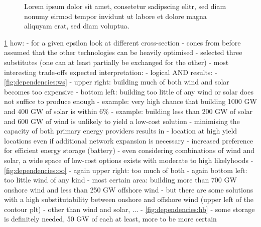 
\begin{figure}
    \noindent{}
    \caption{Lorem ipsum dolor sit amet, consetetur sadipscing elitr, sed diam nonumy eirmod tempor invidunt ut labore et dolore magna aliquyam erat, sed diam voluptua.}
    \label{fig:dependencies}
\end{figure}

\cref{fig:dependencies}
how:
- for a given epsilon look at different cross-section
- cones from before assumed that the other technologies can be heavily optimised
- selected three substitutes (one can at least partially be exchanged for the other) - most interesting trade-offs expected
interpretation:
- logical AND
results:
- \cref{fig:dependencies:ws}
  - upper right: building much of both wind and solar becomes too expensive
  - bottom left: building too little of any wind or solar does not suffice to produce enough
  - example: very high chance that building 1000 GW and 400 GW of solar is within 6\%
  - example: building less than 200 GW of solar and 600 GW of wind is unlikely to yield a low-cost solution
  - minimising the capacity of both primary energy providers results in
    - location at high yield locations even if additional network expansion is necessary
    - increased preference for efficient energy storage (battery)
  - even considering combinations of wind and solar, a wide space of low-cost options exists with moderate to high likelyhoods 
- \cref{fig:dependencies:oo}
  - again upper right: too much of both
  - again bottom left: too little wind of any kind
  - most certain area: building more than 700 GW onshore wind and less than 250 GW offshore wind
  - but there are some solutions with a high substitutability between onshore and offshore wind (upper left of the contour plt)
  - other than wind and solar, ...
- \cref{fig:dependencies:hb}
  - some storage is definitely needed, 50 GW of each at least, more to be more certain 

